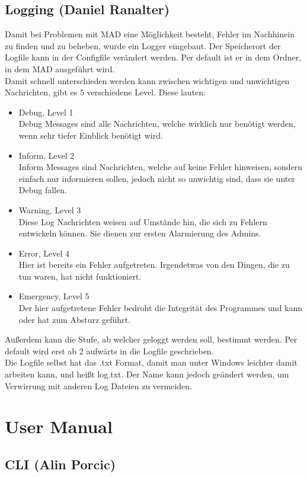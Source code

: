 \documentclass[12pt,a4paper]{report}
\begin{document}
\begin{onehalfspace}
\chapter{Logging (Daniel Ranalter)}
Damit bei Problemen mit MAD eine Möglichkeit besteht, Fehler im Nachhinein zu finden und zu beheben, wurde ein Logger eingebaut. Der Speicherort der Logfile kann in der Configfile verändert werden. Per default ist er in dem Ordner, in dem MAD ausgeführt wird.\\
Damit schnell unterschieden werden kann zwischen wichtigen und unwichtigen Nachrichten, gibt es 5 verschiedene \glqq Level\grqq . Diese lauten:
\begin{itemize}
\item Debug, Level 1\\
Debug Messages sind alle Nachrichten, welche wirklich nur benötigt werden, wenn sehr tiefer Einblick benötigt wird. 
\item Inform, Level 2\\
Inform Messages sind Nachrichten, welche auf keine Fehler hinweisen, sondern einfach nur informieren sollen, jedoch nicht so unwichtig sind, dass sie unter Debug fallen.
\item Warning, Level 3\\
Diese Log Nachrichten weisen auf Umstände hin, die sich zu Fehlern entwickeln können. Sie dienen zur ersten Alarmierung des Admins.
\item Error, Level 4\\
Hier ist bereits ein Fehler aufgetreten. Irgendetwas von den Dingen, die zu tun waren, hat nicht funktioniert. 
\item Emergency, Level 5\\
Der hier aufgetretene Fehler bedroht die Integrität des Programmes und kann oder hat zum Absturz geführt. 
\end{itemize}
Außerdem kann die Stufe, ab welcher geloggt werden soll, bestimmt werden. Per default wird erst ab 2 aufwärts in die Logfile geschrieben.\\

Die Logfile selbst hat das .txt Format, damit man unter Windows leichter damit arbeiten kann, und heißt log.txt. Der Name kann jedoch geändert werden, um Verwirrung mit anderen Log Dateien zu vermeiden. 

\part{User Manual}
\chapter{CLI (Alin Porcic)} \label{chap:CLI_UM}


\end{onehalfspace}
\end{document}
